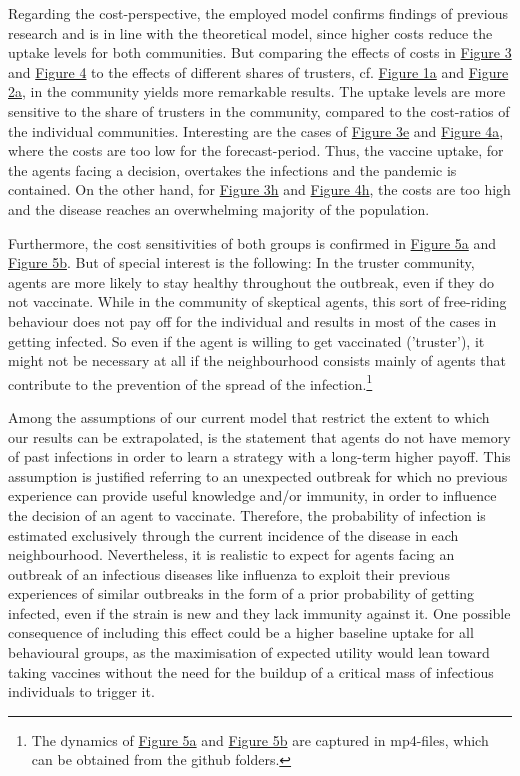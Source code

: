 \documentclass[11pt]{article}
\begin{document}
Regarding the cost-perspective, the employed model confirms findings of previous research and is in line with the theoretical model, since higher costs reduce the uptake levels for both communities. But comparing the effects of costs in \hyperref[fig:3a]{Figure 3} and \hyperref[fig:4a]{Figure 4} to the effects of different shares of trusters, cf. \hyperref[fig:1a]{Figure 1a} and \hyperref[fig:2a]{Figure 2a}, in the community yields more remarkable results. The uptake levels are more sensitive to the share of trusters in the community, compared to the cost-ratios of the individual communities. 
Interesting are the cases of \hyperref[fig:3e]{Figure 3e} and \hyperref[fig:4a]{Figure 4a}, where the costs are too low for the forecast-period. Thus, the vaccine uptake, for the agents facing a decision, overtakes the infections and the pandemic is contained. On the other hand, for \hyperref[fig:3h]{Figure 3h} and \hyperref[fig:4h]{Figure 4h}, the costs are too high and the disease reaches an overwhelming majority of the population.

Furthermore, the cost sensitivities of both groups is confirmed in \hyperref[fig:5a]{Figure 5a} and \hyperref[fig:5b]{Figure 5b}. But of special interest is the following: In the truster community, agents are more likely to stay healthy throughout the outbreak, even if they do not vaccinate. While in the community of skeptical agents, this sort of free-riding behaviour does not pay off for the individual and results in most of the cases in getting infected. So even if the agent is willing to get vaccinated ('truster'), it might not be necessary at all if the neighbourhood consists mainly of agents that contribute to the prevention of the spread of the infection.\footnote{The dynamics of \hyperref[fig:5a]{Figure 5a} and \hyperref[fig:5b]{Figure 5b} are captured in mp4-files, which can be obtained from the github folders.}

Among the assumptions of our current model that restrict the extent to which our results can be extrapolated, is the statement that agents do not have memory of past infections in order to learn a strategy with a long-term higher payoff. This assumption is justified referring to an unexpected outbreak for which no previous experience can provide useful knowledge and/or immunity, in order to influence the decision of an agent to vaccinate. Therefore, the probability of infection is estimated exclusively through the current incidence of the disease in each neighbourhood. Nevertheless, it is realistic to expect for agents facing an outbreak of an infectious diseases like influenza to exploit their previous experiences of similar outbreaks in the form of a prior probability of getting infected, even if the strain is new and they lack immunity against it. One possible consequence of including this effect could be a higher baseline uptake for all behavioural groups, as the maximisation of expected utility would lean toward taking vaccines without the need for the buildup of a critical mass of infectious individuals to trigger it.
\end{document}
